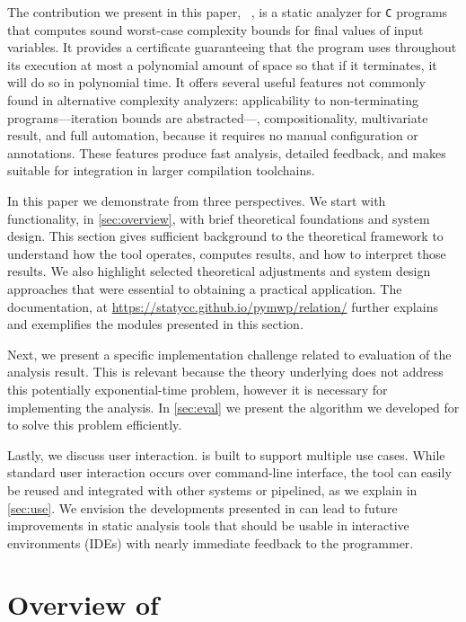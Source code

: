 {{    The contribution we present in this paper, {\pymwp}~\cite{pymwp}, is a static analyzer for \texttt{C} programs that computes sound worst-case complexity bounds for final values of input variables.
    It provides a certificate guaranteeing that the program uses throughout its execution at most a polynomial amount of space so that if it terminates, it will do so in polynomial time.
    It offers several useful features not commonly found in alternative complexity analyzers: applicability to non-terminating programs---\eg iteration bounds are
    abstracted---, compositionality, multivariate result, and full automation, because it requires no manual configuration or annotations.
    These features produce fast analysis, detailed feedback, and makes \pymwps suitable for integration in larger compilation toolchains.

    In this paper we demonstrate \pymwps from three perspectives.
    We start with functionality, in \autoref{sec:overview}, with brief theoretical foundations and system design.
    This section gives sufficient background to the theoretical framework to understand how the tool operates,
    computes results, and how to interpret those results.
    We also highlight selected theoretical adjustments and system design approaches that were essential to obtaining a practical application.
    The documentation, \eg at \url{https://statycc.github.io/pymwp/relation/} further explains and exemplifies the modules presented in this section.

    Next, we present a specific implementation challenge related to evaluation of the analysis result.
    This is relevant because the theory underlying \pymwps does not address this potentially exponential-time problem, however it is necessary for implementing the analysis.
    In \autoref{sec:eval} we present the algorithm we developed for \pymwps to solve this problem efficiently.

    Lastly, we discuss user interaction.
    \pymwps is built to support multiple use cases.
    While standard user interaction occurs over command-line interface, the tool can easily be reused and integrated with other systems or pipelined, as we explain in \autoref{sec:use}.
    We envision the developments presented in \pymwps can lead to future improvements in static analysis tools that should be usable in interactive environments (\eg IDEs) with nearly immediate feedback to the programmer.

    \section{Overview of \pymwp}
    \label{sec:overview}

}}
